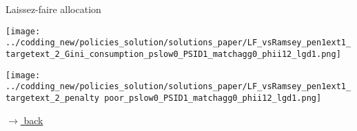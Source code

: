 \documentclass[11pt,aspectratio=169]{beamer}
\begin{document}
	
	\begin{frame}{Laissez-faire allocation}
		\hypertarget{LF}{}
		\vspace{6mm}
		\begin{center}
			\begin{minipage}[]{0.45\textwidth}
				\texttt{[image: ../codding\_new/policies\_solution/solutions\_paper/LF\_vsRamsey\_pen1ext1\_targetext\_2\_Gini\_consumption\_pslow0\_PSID1\_matchagg0\_phii12\_lgd1.png]}
			\end{minipage}	
			\begin{minipage}[]{0.45\textwidth}
				\texttt{[image: ../codding\_new/policies\_solution/solutions\_paper/LF\_vsRamsey\_pen1ext1\_targetext\_2\_penalty poor\_pslow0\_PSID1\_matchagg0\_phii12\_lgd1.png]}
			\end{minipage}	
		\end{center}
		\vspace{11mm}
		\hfill
		\hyperlink{backLF}{\tiny{$\rightarrow$ back}}
	\end{frame}
	
	
	
\end{document}
